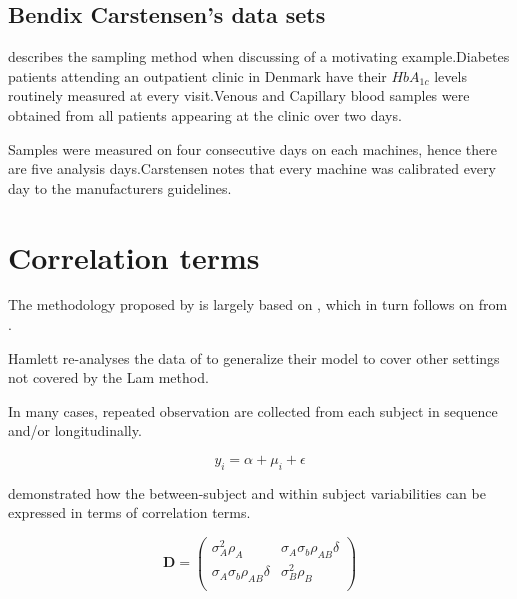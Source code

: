 \documentclass[12pt, a4paper]{report}
\theoremstyle{plain}
\theoremstyle{definition}
\theoremstyle{remark}
\begin{document}
\newpage

\subsection{Bendix Carstensen's data sets}
\citet{BXC2008} describes the sampling method when discussing of a motivating example.Diabetes patients attending an outpatient clinic in Denmark have their $HbA_{1c}$ levels routinely measured at every visit.Venous and Capillary blood samples were obtained from all patients appearing at the clinic over two days.

Samples were measured on four consecutive days on each machines, hence there are five analysis days.Carstensen notes that every machine was calibrated every day to  the manufacturers guidelines.



\section{Correlation terms}
The methodology proposed by \citet{ARoy2009} is largely based on \citet{hamlett}, which in turn follows on from \citet{lam}.



Hamlett re-analyses the data of \citet{lam} to generalize their model to cover other settings not covered by the Lam method.

In many cases, repeated observation are collected from each subject in sequence  and/or longitudinally.


\[ y_i = \alpha + \mu_i + \epsilon \]

\citet{hamlett} demonstrated how the between-subject and within subject variabilities can be expressed in terms of
correlation terms.

\[
\boldsymbol{D} = \left( \begin{array}{cc}
\sigma^2_{A}\rho_{A} & \sigma_{A}\sigma_{b}\rho_{AB}\delta \\
\sigma_{A}\sigma_{b}\rho_{AB}\delta & \sigma^2_{B}\rho_{B}\\

\end{array}\right)
\]
\end{document}
